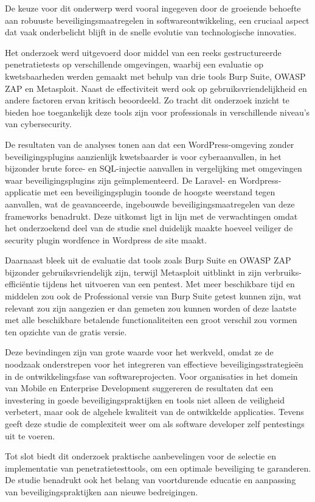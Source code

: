 De keuze voor dit onderwerp werd vooral ingegeven door de groeiende behoefte aan robuuste beveiligingsmaatregelen in softwareontwikkeling, een cruciaal 
aspect dat vaak onderbelicht blijft in de snelle evolutie van technologische innovaties. 

Het onderzoek werd uitgevoerd door middel van een reeks gestructureerde penetratietests op verschillende omgevingen, waarbij een evaluatie op 
kwetsbaarheden werden gemaakt met behulp van drie tools Burp Suite, OWASP ZAP en Metasploit. Naast de effectiviteit werd ook op gebruiksvriendelijkheid en andere factoren 
ervan kritisch beoordeeld. Zo tracht dit onderzoek inzicht te bieden hoe toegankelijk deze tools zijn voor professionals in verschillende 
niveau's van cybersecurity.

De resultaten van de analyses tonen aan dat een WordPress-omgeving zonder beveiligingsplugins aanzienlijk kwetsbaarder is voor cyberaanvallen, in het bijzonder  
brute force- en SQL-injectie aanvallen in vergelijking met omgevingen waar beveiligingsplugins zijn geïmplementeerd. De Laravel- 
en Wordpress-applicatie met een beveiligingsplugin toonde 
de hoogste weerstand tegen aanvallen, wat de geavanceerde, ingebouwde beveiligingsmaatregelen van deze frameworks benadrukt.
Deze uitkomst ligt in lijn met de verwachtingen omdat het onderzoekend deel van de studie snel duidelijk maakte hoeveel veiliger 
de security plugin wordfence in Wordpress de site maakt.

Daarnaast bleek uit de evaluatie dat tools zoals Burp Suite en OWASP ZAP bijzonder gebruiksvriendelijk zijn, terwijl Metasploit 
uitblinkt in zijn verbruiks-efficiëntie tijdens het uitvoeren van een pentest. Met meer beschikbare tijd en middelen zou ook 
de Professional versie van Burp Suite getest kunnen zijn, wat relevant zou zijn aangezien er dan gemeten zou kunnen worden of deze 
laatste met alle beschikbare betalende functionaliteiten een groot verschil zou vormen ten opzichte van de gratis versie.

Deze bevindingen zijn van grote waarde voor het werkveld, omdat ze de noodzaak onderstrepen voor het integreren van effectieve 
beveiligingsstrategieën in de ontwikkelingsfase van softwareprojecten. Voor organisaties in het domein van Mobile en Enterprise 
Development suggereren de resultaten dat een investering in goede beveiligingspraktijken en tools niet alleen de veiligheid 
verbetert, maar ook de algehele kwaliteit van de ontwikkelde applicaties. Tevens geeft deze studie de complexiteit weer 
om als software developer zelf pentestings uit te voeren.

Tot slot biedt dit onderzoek praktische aanbevelingen voor de selectie en implementatie van penetratietesttools, 
om een optimale beveiliging te 
garanderen. De studie benadrukt ook het belang van voortdurende educatie en aanpassing van beveiligingspraktijken aan nieuwe 
bedreigingen.
